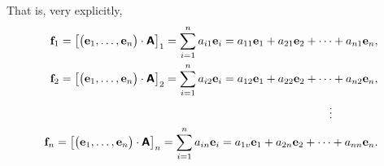 That is, very explicitly,
\begin{equation}
\begin{split}
{\bf f}_1=
\left[\begin{pmatrix}{\bf e}_1,\ldots ,{\bf e}_n\end{pmatrix} \cdot \textsf{\textbf{A}}\right]_1     = \sum_{i=1}^n a_{i1} {\bf e}_i
=
a_{11} {\bf e}_1 + a_{21} {\bf e}_2+\cdots + a_{n1} {\bf e}_n,\\
{\bf f}_2=
\left[\begin{pmatrix}{\bf e}_1,\ldots ,{\bf e}_n\end{pmatrix} \cdot \textsf{\textbf{A}}\right]_2=
 \sum_{i=1}^n a_{i2} {\bf e}_i
=
a_{12} {\bf e}_1 + a_{22} {\bf e}_2+\cdots + a_{n2} {\bf e}_n,\\
 \vdots \qquad \qquad \\
{\bf f}_n=
\left[\begin{pmatrix}{\bf e}_1,\ldots ,{\bf e}_n\end{pmatrix} \cdot \textsf{\textbf{A}}\right]_n      = \sum_{i=1}^n a_{in} {\bf e}_i
= a_{1v} {\bf e}_1 + a_{2n} {\bf e}_2+\cdots + a_{nn} {\bf e}_n .
\end{split}
\label{2011-m-btbe-eigen}
\end{equation}


